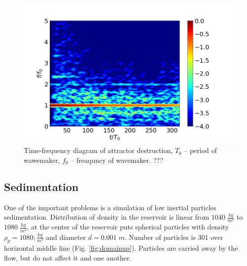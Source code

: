\documentclass{article}
\begin{document}
\begin{figure}
    \centering
    \includegraphics[scale=0.4]{Figs/TFD_pos34693_nperseg400_to0T.png}
    \caption{Time-frequency diagram of attractor destruction, $T_0$ -- period of wawemaker, $f_0$ -- freaquncy of wavemaker. ???}
    \label{fig:tfd}
\end{figure}

\subsection{Sedimentation}

One of the important problems is a simulation of low inertial particles sedimentation. Distribution of density in  the reservoir is linear from $1040\;\frac{kg}{m^3}$ to $1080\;\frac{kg}{m^3}$, at the center of the reservoir puts spherical particles with density $\rho_p = 1080;\frac{kg}{m^3}$ and diameter $d=0.001 \; m$.  Number of particles is 301 over horizontal middle line (Fig. \ref{fig:domainup}). Particles are carried away by the flow, but do not affect it and one another.
\end{document}
